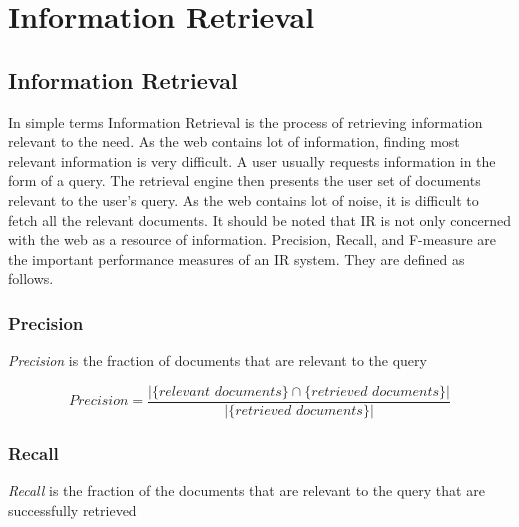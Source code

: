
\chapter{Information Retrieval} %

\label{ir} %



\section{Information Retrieval}

\par 
In simple terms Information Retrieval is the process of retrieving information relevant to the need. As the web contains lot of
information, finding most relevant information is very difficult. A user usually requests information in the form of a query.
The retrieval engine then presents the user set of documents relevant to the user's query. As the web contains lot of noise, it
is difficult to fetch all the relevant documents. It should be noted that IR is not only concerned with the web as a resource of
information. Precision, Recall, and F-measure are the important performance measures of an IR system. They are defined as follows.

\subsection*{Precision}

\textit{Precision} is the fraction of documents that are relevant to the query

\begin{equation}
 Precision = \frac{|\{\textit{relevant documents}\} \cap \{\textit{retrieved documents}\}|}{|\{\textit{retrieved documents}\}|}
\end{equation}

\subsection*{Recall}

\textit{Recall} is the fraction of the documents that are relevant to the query that are successfully retrieved

